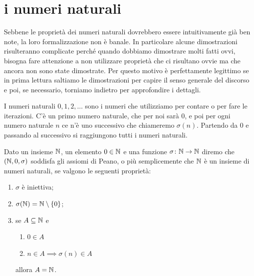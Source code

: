 \section{i numeri naturali}
\label{sec:naturali}

Sebbene le proprietà dei numeri naturali dovrebbero essere intuitivamente già ben note,
la loro formalizzazione non è banale.
In particolare alcune dimostrazioni risulteranno complicate perché quando dobbiamo dimostrare 
molti fatti ovvi, bisogna fare attenzione a non utilizzare proprietà che ci risultano ovvie 
ma che ancora non sono state dimostrate.
Per questo motivo è perfettamente legittimo se in prima lettura saltiamo le dimostrazioni 
per capire il senso generale del discorso e poi, se necessario, torniamo indietro per
approfondire i dettagli.

I numeri naturali $0,1,2,\dots$ sono i numeri che utilizziamo per contare o per 
fare le iterazioni. C'è un primo numero naturale, che per noi sarà $0$, e poi
per ogni numero naturale $n$ ce n'è uno successivo che chiameremo $\sigma(n)$. 
Partendo da $0$ e passando al successivo si raggiungono tutti i numeri naturali.

\begin{definition}
  \label{def:assiomi_peano}%
  \label{def:naturali}%
  \index{$\NN$}%
Dato un insieme $\NN$, 
un elemento $0\in {\mathbb N}$ 
e una funzione $\sigma\colon {\mathbb N}\to{\mathbb N}$ 
diremo che $({\mathbb N},0,\sigma)$
soddisfa gli assiomi di Peano,
o più semplicemente che $\NN$ è un insieme di numeri naturali,
se valgono le seguenti proprietà: 
\begin{enumerate}
  \item $\sigma$ è iniettiva;
  \item $\sigma({\mathbb N}) = {\mathbb N} \setminus{\left\{ 0 \right\}}$;
  \item se $A\subseteq {\mathbb N}$ e 
  \begin{enumerate} 
    \item[(i)] $0\in A$ 
    \item[(ii)] $n\in A \implies \sigma(n)\in A$
  \end{enumerate}
  allora $A={\mathbb N}$.
\end{enumerate}
\end{definition}

